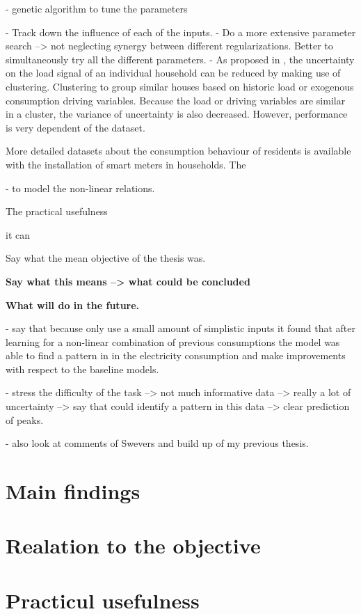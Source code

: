 - genetic algorithm to tune the parameters

- Track down the influence of each of the inputs.
- Do a more extensive parameter search --> not neglecting synergy between different regularizations. Better to simultaneously try all the different parameters.
- As proposed in \cite{Shi2018}, the uncertainty on the load signal of an individual household can be reduced by making use of clustering.  Clustering to group similar houses based on historic load or exogenous consumption driving variables. Because the load or driving variables are similar in a cluster, the variance of uncertainty is also decreased. However, performance is very dependent of the dataset.






 More detailed datasets about the consumption behaviour of residents is available with the installation of smart meters in households. The


- to model the non-linear relations. 


The practical usefulness

it can 


Say what the mean objective of the thesis was. 


\textbf{Say what this means --> what could be concluded}




\textbf{What will do in the future.}

- say that because only use a small amount of simplistic inputs it found that after learning for a non-linear combination of previous consumptions the model was able to find a pattern in in the electricity consumption and make improvements with respect to the baseline models.

- stress the difficulty of the task --> not much informative data --> really a lot of uncertainty --> say that could identify a pattern in this data --> clear prediction of peaks.

- also look at comments of Swevers and build up of my previous thesis.

\section{Main findings}


\section{Realation to the objective}


\section{Practicul usefulness}



